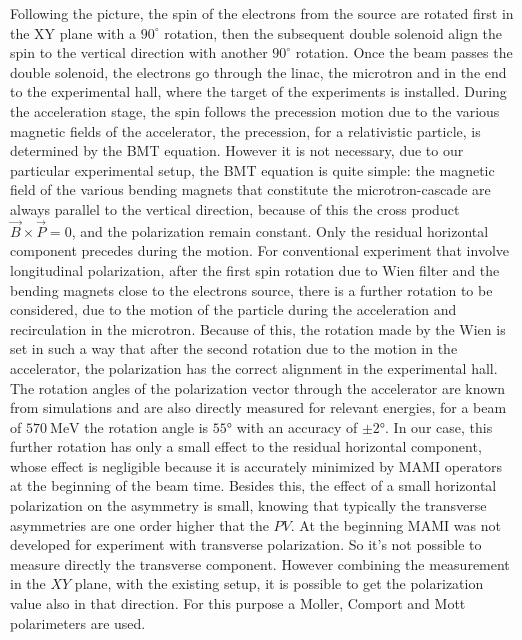 Following the picture, the spin of the electrons from the source are rotated first in the XY plane with a $90^{\circ}$ rotation, then the subsequent double solenoid align the spin to the vertical direction with another $90^{\circ}$ rotation. 
Once the beam passes the double solenoid, the electrons go through the linac, the microtron and in the end to the experimental hall, where the target of the experiments is installed. During the acceleration stage, the spin follows the precession motion due to the various magnetic fields of the accelerator, the precession, for a relativistic particle, is determined by the BMT equation.
However it is not necessary, due to our particular experimental setup, the BMT equation is quite simple: the magnetic field of the various bending magnets that constitute the microtron-cascade are always parallel to the vertical direction, because of this the cross product $\vec{B} \times \vec{P} = 0$, and the polarization remain constant. Only the residual horizontal component precedes during the motion. For conventional experiment that involve longitudinal polarization, after the first spin rotation due to Wien filter and the bending magnets close to the electrons source, there is a further rotation to be considered, due to the motion of the particle during the acceleration and recirculation in the microtron. Because of this, the rotation made by the Wien is set in such a way that after the second rotation due to the motion in the accelerator, the polarization has the correct alignment in the experimental hall. The rotation angles of the polarization vector through the accelerator are known from simulations and are also directly measured for relevant energies, for a beam of $\SI{570}{\mega \electronvolt}$ the rotation angle is $\ang{55}$ with an accuracy of $\pm \ang{2}$. In our case, this further rotation has only a small effect to the residual horizontal component, whose effect is negligible because it is accurately minimized by MAMI operators at the beginning of the beam time. Besides this, the effect of a small horizontal polarization on the asymmetry is small, knowing that typically the transverse asymmetries are one order higher that the $PV$.
At the beginning MAMI was not developed for experiment with transverse polarization. So it's not possible to measure directly the transverse component. However combining the measurement in the $XY$ plane, with the existing setup, it is possible to get the polarization value also in that direction. For this purpose a Moller, Comport and Mott polarimeters are used.


